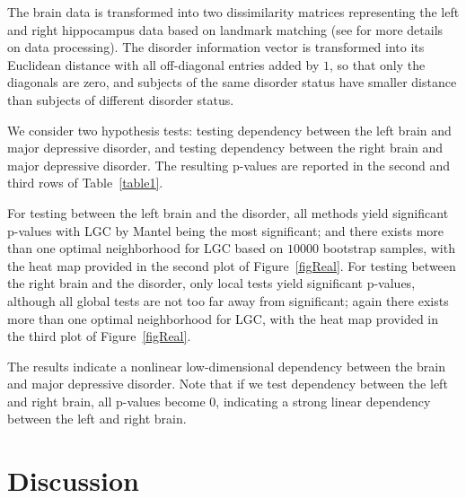 \documentclass[11pt]{article}
\begin{document}
The brain data is transformed into two dissimilarity matrices representing the left and right hippocampus data based on landmark matching (see \cite{ParkEtAl2011} for more details on data processing). The disorder information vector is transformed into its Euclidean distance with all off-diagonal entries added by $1$, so that only the diagonals are zero, and subjects of the same disorder status have smaller distance than subjects of different disorder status.

We consider two hypothesis tests: testing dependency between the left brain and major depressive disorder, and testing dependency between the right brain and major depressive disorder. The resulting p-values are reported in the second and third rows of Table~\ref{table1}.

For testing between the left brain and the disorder, all methods yield significant p-values with LGC by Mantel being the most significant; and there exists more than one optimal neighborhood for LGC based on $10000$ bootstrap samples, with the heat map provided in the second plot of Figure~\ref{figReal}. For testing between the right brain and the disorder, only local tests yield significant p-values, although all global tests are not too far away from significant; again there exists more than one optimal neighborhood for LGC, with the heat map provided in the third plot of Figure~\ref{figReal}. 


The results indicate a nonlinear low-dimensional dependency between the brain and major depressive disorder. Note that if we test dependency between the left and right brain, all p-values become $0$, indicating a strong linear dependency between the left and right brain.

\section{Discussion}
\label{conclu}
\end{document}
